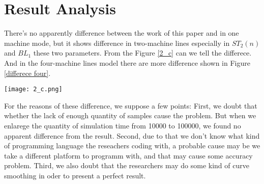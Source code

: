 \section{Result Analysis}
\noindent There's no apparently difference between the work of this paper and \cite{chen2015transient} in one machine mode, but it shows difference in two-machine lines especially in $ST_2(n)$ and $BL_1$ these two parameters. From the Figure \ref{2_c} can we tell the differece. And in the four-machine lines model there are more difference shown in Figure \ref{differece four}.




\begin{figure*}[!h]
	\centering
	\texttt{[image: 2\_c.png]}
	\caption{Performance contrast of a two-machine geometric line $ST_2(n) \ and\ BL_2(n)$}
	\label{2_c}
\end{figure*}

\begin{figure*}[!h]
	\centering
	\caption{Transients of a four-machine geometric line. (a) $PR(n) \ and\ CR(n)$;(b) $WIP(n)$; (c) $ST_i(n)$;(d) $BL_i(n)$.}
	\label{differece four}
\end{figure*}

For the reasons of these difference, we suppose a few points: First, we doubt that whether the lack of enough quantity of samples cause the problem. But when we enlarege the quantity of simulation time from 10000 to 100000, we found no apparent difference from the result. Second, due to that we don't know what kind of programming language the reseachers coding with, a probable cause may be we take a different platform to programm with, and that may cause some accuracy problem. Third, we also doubt that the researchers may do some kind of curve smoothing in oder to present a perfect result.